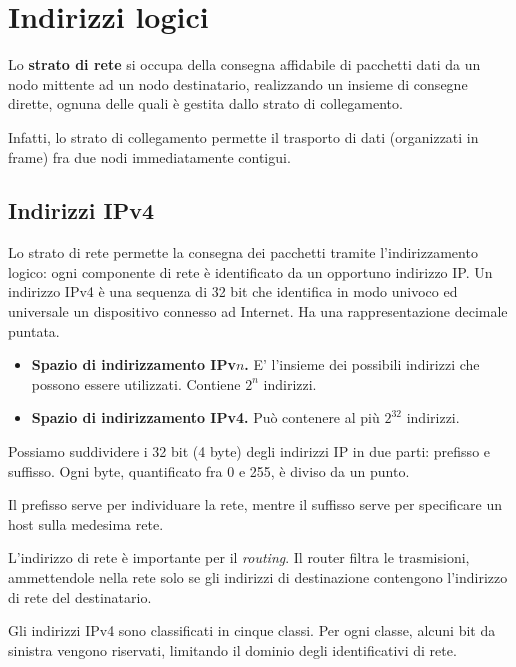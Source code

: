 \section{Indirizzi logici}

    Lo \textbf{strato di rete} si occupa della consegna affidabile di pacchetti dati da un nodo mittente ad un nodo destinatario, realizzando un insieme di consegne dirette, ognuna delle quali è gestita dallo strato di collegamento.
    
    Infatti, lo strato di collegamento permette il trasporto di dati (organizzati in frame) fra due nodi immediatamente contigui.
    
    \subsection{Indirizzi IPv4}
    
        Lo strato di rete permette la consegna dei pacchetti tramite l'indirizzamento logico: ogni componente di rete è identificato da un opportuno indirizzo IP. Un indirizzo IPv4 è una sequenza di 32 bit che identifica in modo univoco ed universale un dispositivo connesso ad Internet. Ha una rappresentazione decimale puntata.
        
        \begin{itemize}
            \item
                \textbf{Spazio di indirizzamento IPv$n$.} E' l'insieme dei possibili indirizzi che possono essere utilizzati. Contiene $2^n$ indirizzi.
            
            \item
                \textbf{Spazio di indirizzamento IPv4.} Può contenere al più $2^32$ indirizzi.
        \end{itemize} 
        
        Possiamo suddividere i 32 bit (4 byte) degli indirizzi IP in due parti: prefisso e suffisso. Ogni byte, quantificato fra 0 e 255, è diviso da un punto.
        
        Il prefisso serve per individuare la rete, mentre il suffisso serve per specificare un host sulla medesima rete.
        
        L'indirizzo di rete è importante per il \textit{routing}. Il router filtra le trasmisioni, ammettendole nella rete solo se gli indirizzi di destinazione contengono l'indirizzo di rete del destinatario.
        
        Gli indirizzi IPv4 sono classificati in cinque classi. Per ogni classe, alcuni bit da sinistra vengono riservati, limitando il dominio degli identificativi di rete.
        
